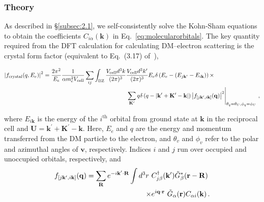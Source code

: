\documentclass[
    prd, twocolumn, superscriptaddress, nofootinbib, amsmath, amssymb,
    aps, floatfix,preprintnumbers
]{revtex4-2}
\begin{document}
        \subsubsection{Theory}\label{subsec:2.2.1}
        As described in \S \ref{subsec:2.1}, we self-consistently solve the Kohn-Sham equations to obtain the coefficients $C_{i\alpha}(\mathbf{k})$ in Eq.~\eqref{eq:molecularorbitals}. The key quantity required from the DFT calculation for calculating DM--electron scattering is the crystal form factor (equivalent to Eq.~(3.17) of~\cite{Essig:2015cda}), 
        \begin{widetext}
            \begin{equation}\label{eq:theoryFF}
                \begin{split}
                    \left|f_{\rm crystal}(q, E_e)\right|^2 = \frac{2\pi^2}{E_e}\frac{1}{\alpha m_e^2 V_\mathrm{cell}}\sum_{ij}\int_{\rm BZ}\frac{V_\mathrm{cell}d^3k}{(2\pi)^3}&\frac{V_\mathrm{cell}d^3k^\prime}{(2\pi)^3}E_e\delta\left(E_e - (E_{j\mathbf{k}^\prime} - E_{i\mathbf{k}})\right) \times\\
                    &\left.\sum_\mathbf{K^\prime}q\delta\left(q -\left|\mathbf{k^\prime+K^\prime - k}\right|\right)\left|f_{\left[j\mathbf{k}^\prime,i\mathbf{k}\right]}(\mathbf{q})\right|^2\right|_{\theta_q = \theta_U, \phi_q = \phi_U}\,,
                \end{split}
            \end{equation}
        \end{widetext}
        where $E_{i\mathbf{k}}$ is the energy of the $i^\mathrm{th}$ orbital from ground state at $\mathbf{k}$ in the reciprocal cell and $\mathbf{U = k^\prime +K^\prime - k}$. Here, $E_e$ and $q$ are the energy and momentum transferred from the DM particle to the electron, and $\theta_v$ and $\phi_v$ refer to the polar and azimuthal angles of $\mathbf{v}$, respectively. Indices $i$ and $j$ run over occupied and unoccupied orbitals, respectively, and 
        \begin{equation}\label{eq:mat_elems}
            \begin{split}
                f_{\left[j\mathbf{k}^\prime,i\mathbf{k}\right]}(\mathbf{q}) = \sum_\mathbf{R}e^{-i\mathbf{k}^\prime\cdot\mathbf{R}} \int d^3 r\ & C^\dagger_{j\beta}(\mathbf{k}^\prime)\Tilde{G}^*_\beta(\mathbf{r - R}) \\\times&e^{i\mathbf{q\cdot r}}\ \Tilde{G}_\alpha (\mathbf{r})C_{\alpha i}(\mathbf{k})\, .
            \end{split}
        \end{equation}
\end{document}
